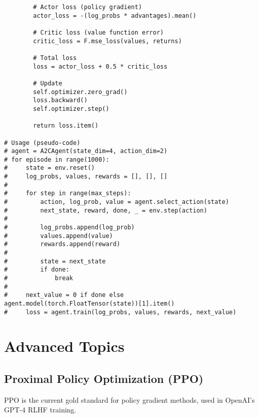 \begin{codebox}
\begin{lstlisting}
        # Actor loss (policy gradient)
        actor_loss = -(log_probs * advantages).mean()
        
        # Critic loss (value function error)
        critic_loss = F.mse_loss(values, returns)
        
        # Total loss
        loss = actor_loss + 0.5 * critic_loss
        
        # Update
        self.optimizer.zero_grad()
        loss.backward()
        self.optimizer.step()
        
        return loss.item()

# Usage (pseudo-code)
# agent = A2CAgent(state_dim=4, action_dim=2)
# for episode in range(1000):
#     state = env.reset()
#     log_probs, values, rewards = [], [], []
#     
#     for step in range(max_steps):
#         action, log_prob, value = agent.select_action(state)
#         next_state, reward, done, _ = env.step(action)
#         
#         log_probs.append(log_prob)
#         values.append(value)
#         rewards.append(reward)
#         
#         state = next_state
#         if done:
#             break
#     
#     next_value = 0 if done else agent.model(torch.FloatTensor(state))[1].item()
#     loss = agent.train(log_probs, values, rewards, next_value)
\end{lstlisting}
\end{codebox}

\section{Advanced Topics}

\subsection{Proximal Policy Optimization (PPO)}

PPO is the current gold standard for policy gradient methods, used in OpenAI's GPT-4 RLHF training.

